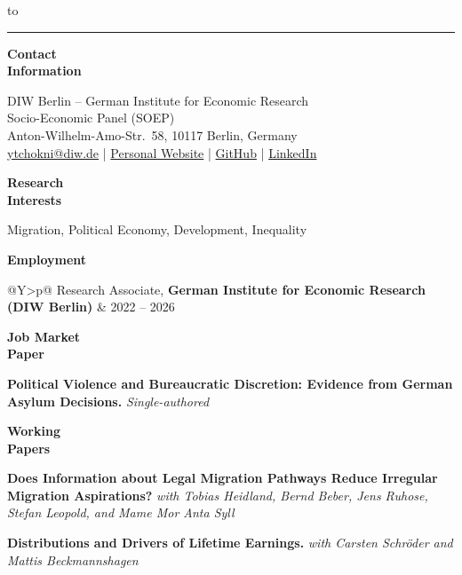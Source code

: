\documentclass[a4paper,9pt]{extarticle}
\newlength{\lw}\setlength{\lw}{1.95cm}
\newlength{\sw}\setlength{\sw}{0.15cm}
\newlength{\cw}\setlength{\cw}{\dimexpr\textwidth-\lw-\sw\relax}
\newlength{\dw}\setlength{\dw}{3.5cm}
\newcommand{\cvsection}[2]{%
  \vspace{1.6em}%
  \noindent
  \parbox[t]{\lw}{\vspace{0pt}\raggedright\textbf{#1}}%
  \hspace{\sw}%
  \parbox[t]{\cw}{\vspace{0pt}\raggedright #2}%
  \par
}
\newcommand{\cvtabsection}[2]{%
  \vspace{1.6em}%
  \noindent
  \parbox[t]{\lw}{\vspace{0pt}\raggedright\textbf{#1}}%
  \hspace{\sw}%
  \parbox[t]{\cw}{\vspace{-3pt}\raggedright #2}%
  \par
}
\begin{document}
\noindent\leavevmode\hbox to %
\par\nointerlineskip\vspace{0.5em}%
\noindent\rule{\textwidth}{0.4pt}

\cvsection{Contact\\Information}{%
  DIW Berlin -- German Institute for Economic Research\\
  Socio-Economic Panel (SOEP)\\
  Anton-Wilhelm-Amo-Str.\ 58, 10117 Berlin, Germany\\[0.4em]
  \href{mailto:ytchokni@diw.de}{ytchokni@diw.de} \enspace|\enspace
  \href{https://sites.google.com/view/yogamtchokni/}{Personal Website} \enspace|\enspace
  \href{https://github.com/ytchokni}{GitHub} \enspace|\enspace
  \href{https://www.linkedin.com/in/yogam-tchokni-003a03175/}{LinkedIn}%
}

\cvsection{Research\\Interests}{%
  Migration, Political Economy, Development, Inequality%
}

\cvtabsection{Employment}{%
  \begin{tabularx}{\cw}{@{}Y>{\raggedleft\arraybackslash}p{\dw}@{}}
    Research Associate, \textbf{German Institute for Economic Research (DIW Berlin)} & 2022 -- 2026 \\
  \end{tabularx}%
}

\cvsection{Job Market\\Paper}{%
  \textbf{Political Violence and Bureaucratic Discretion: Evidence from German Asylum Decisions.}%
  \newline\textit{Single-authored}%
}

\cvsection{Working\\Papers}{%
  \textbf{Does Information about Legal Migration Pathways Reduce Irregular Migration Aspirations?}%
  \newline\textit{with Tobias Heidland, Bernd Beber, Jens Ruhose, Stefan Leopold, and Mame Mor Anta Syll}%
  \par\vspace{1.0em}%
  \textbf{Distributions and Drivers of Lifetime Earnings.}%
  \newline\textit{with Carsten Schr\"oder and Mattis Beckmannshagen}%
}
\end{document}
